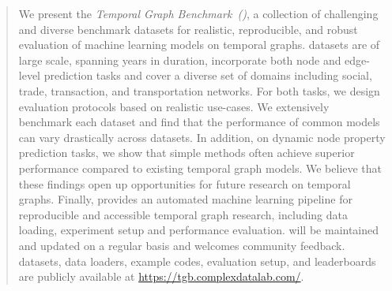 

\begin{abstract}
We present the \emph{Temporal Graph Benchmark~(\name)}, a collection of challenging and diverse benchmark datasets for realistic, reproducible, and robust evaluation of machine learning models on temporal graphs. \name datasets are of large scale, spanning years in duration, incorporate both node and edge-level prediction tasks and cover a diverse set of domains including social, trade, transaction, and transportation networks. For both tasks, we design evaluation protocols based on realistic use-cases. We extensively benchmark each dataset and find that the performance of common models can vary drastically across datasets. In addition, on dynamic node property prediction tasks, we show that simple methods often achieve superior performance compared to existing temporal graph models. We believe that these findings open up opportunities for future research on temporal graphs. Finally, \name provides an automated machine learning pipeline for reproducible and accessible temporal graph research, including data loading, experiment setup and performance evaluation. \name will be maintained and updated on a regular basis and welcomes community feedback. \name datasets, data loaders, example codes, evaluation setup, and leaderboards are publicly available at \url{https://tgb.complexdatalab.com/}.
\end{abstract}




